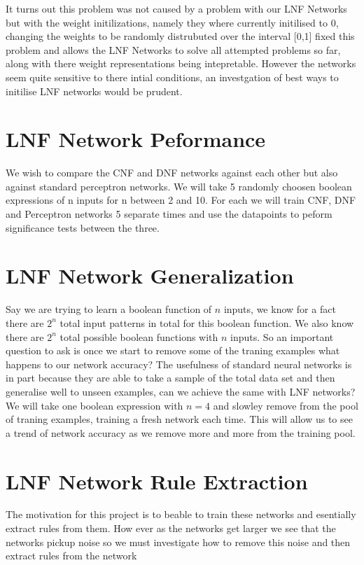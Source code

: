 \documentclass{article}
\theoremstyle{definition}
\begin{document}
It turns out this problem was not caused by a problem with our LNF Networks but with the weight initilizations, namely they where currently initilised to 0, changing the weights to be randomly distrubuted over the interval [0,1] fixed this problem and allows the LNF Networks to solve all attempted problems so far, along with there weight representations being intepretable. However the networks seem quite sensitive to there intial conditions, an investgation of best ways to initilise LNF networks would be prudent.

\section{LNF Network Peformance}
We wish to compare the CNF and DNF networks against each other but also against standard perceptron networks. We will take 5 randomly choosen boolean expressions of n inputs for n between 2 and 10. For each we will train CNF, DNF and Perceptron networks 5 separate times and use the datapoints to peform significance tests between the three.

\section{LNF Network Generalization}
Say we are trying to learn a boolean function of $n$ inputs, we know for a fact there are $2^n$ total input patterns in total for this boolean function. We also know there are $2^n$ total possible boolean functions with $n$ inputs. So an important question to ask is once we start to remove some of the traning examples what happens to our network accuracy? The usefulness of standard neural networks is in part because they are able to take a sample of the total data set and then generalise well to unseen examples, can we achieve the same with LNF networks?\\

We will take one boolean expression with $n = 4$ and slowley remove from the pool of traning examples, training a fresh network each time. This will allow us to see a trend of network accuracy as we remove more and more from the training pool.

\section{LNF Network Rule Extraction}
The motivation for this project is to beable to train these networks and esentially extract rules from them. How ever as the networks get larger we see that the networks pickup noise so we must investigate how to remove this noise and then extract rules from the network
\end{document}
